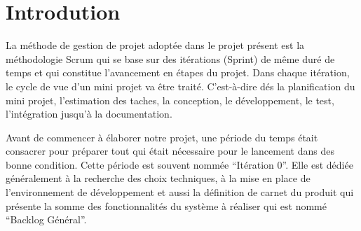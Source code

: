 \chapter*{Introdution}

La méthode de gestion de projet adoptée dans le projet présent est la
méthodologie Scrum qui se base sur des itérations (Sprint) de même duré de
temps et qui constitue l'avancement en étapes du projet. Dans chaque itération,
le cycle de vue d'un mini projet va être traité. C'est-à-dire dés la
planification du mini projet, l'estimation des taches, la conception, le
développement, le test, l'intégration jusqu'à la documentation.

Avant de commencer à élaborer notre projet, une période du temps était
consacrer pour préparer tout qui était nécessaire pour le lancement dans des
bonne condition.  Cette période est souvent nommée ``Itération 0''. Elle est
dédiée généralement à la recherche des choix techniques, à la mise en place de
l'environnement de développement et aussi la définition de carnet du produit
qui présente la somme des fonctionnalités du système à réaliser qui est nommé
``Backlog Général''.
